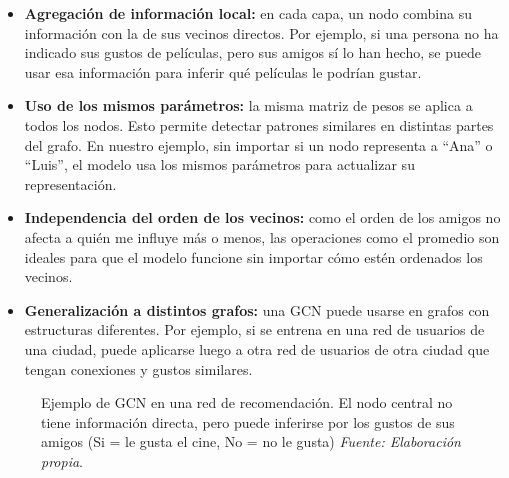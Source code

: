\documentclass[11pt]{article} %
\begin{document}
\begin{itemize}
    \item \textbf{Agregación de información local:} en cada capa, un nodo combina su información con la de sus vecinos directos. Por ejemplo, si una persona no ha indicado sus gustos de películas, pero sus amigos sí lo han hecho, se puede usar esa información para inferir qué películas le podrían gustar.

    \item \textbf{Uso de los mismos parámetros:} la misma matriz de pesos se aplica a todos los nodos. Esto permite detectar patrones similares en distintas partes del grafo. En nuestro ejemplo, sin importar si un nodo representa a “Ana” o “Luis”, el modelo usa los mismos parámetros para actualizar su representación.

    \item \textbf{Independencia del orden de los vecinos:} como el orden de los amigos no afecta a quién me influye más o menos, las operaciones como el promedio son ideales para que el modelo funcione sin importar cómo estén ordenados los vecinos.

    \item \textbf{Generalización a distintos grafos:} una GCN puede usarse en grafos con estructuras diferentes. Por ejemplo, si se entrena en una red de usuarios de una ciudad, puede aplicarse luego a otra red de usuarios de otra ciudad que tengan conexiones y gustos similares.
\end{itemize}

\begin{figure}[H]
    \centering
    \caption{Ejemplo de GCN en una red de recomendación. El nodo central no tiene información directa, pero puede inferirse por los gustos de sus amigos (Si = le gusta el cine, No = no le gusta) \textit{Fuente: Elaboración propia}.}
    \label{fig:movie_recommendation}
\end{figure}
\end{document}
